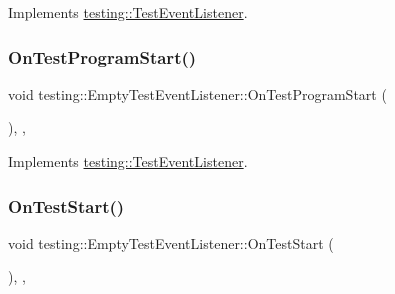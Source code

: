 Implements \hyperlink{classtesting_1_1TestEventListener_ad15b6246d94c268e233487a86463ef3d}{testing\+::\+Test\+Event\+Listener}.

\mbox{\label{classtesting_1_1EmptyTestEventListener_ac3f5033fcd82080edb45f546ce9854fe}} 
\subsubsection{\texorpdfstring{On\+Test\+Program\+Start()}{OnTestProgramStart()}}
{\footnotesize\ttfamily void testing\+::\+Empty\+Test\+Event\+Listener\+::\+On\+Test\+Program\+Start (\begin{DoxyParamCaption}\item[{const \hyperlink{classtesting_1_1UnitTest}{Unit\+Test} \&}]{ }\end{DoxyParamCaption})\hspace{0.3cm}{\ttfamily [inline]}, {\ttfamily [override]}, {\ttfamily [virtual]}}



Implements \hyperlink{classtesting_1_1TestEventListener_a5f6c84f39851e8a603a2d2e10063816b}{testing\+::\+Test\+Event\+Listener}.

\mbox{\label{classtesting_1_1EmptyTestEventListener_a1d8c7f3f1f92826f668edae1bc5aadf4}} 
\subsubsection{\texorpdfstring{On\+Test\+Start()}{OnTestStart()}}
{\footnotesize\ttfamily void testing\+::\+Empty\+Test\+Event\+Listener\+::\+On\+Test\+Start (\begin{DoxyParamCaption}\item[{const \hyperlink{classtesting_1_1TestInfo}{Test\+Info} \&}]{ }\end{DoxyParamCaption})\hspace{0.3cm}{\ttfamily [inline]}, {\ttfamily [override]}, {\ttfamily [virtual]}}



